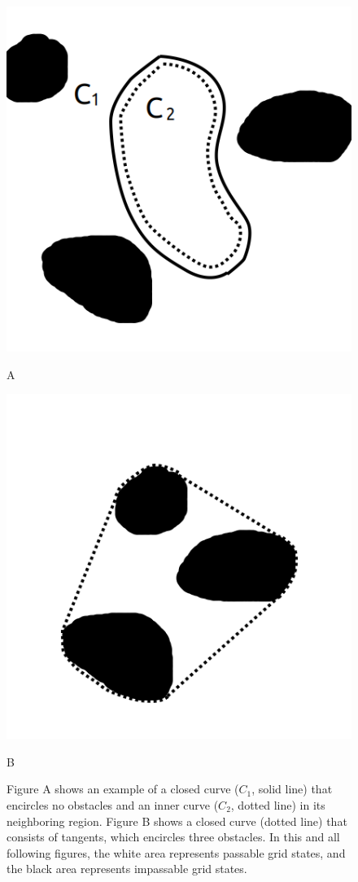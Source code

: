 \documentclass[letterpaper, 10 pt, journal, twoside]{IEEEtran}
\begin{document}
\begin{figure}[t] \scriptsize
\begin{minipage}{.48\linewidth}
  \centerline{\includegraphics[width=4.cm, cframe=gray .2mm]{empty_closed.png}}
  \centerline{A}
\end{minipage}
\hfill
\begin{minipage}{.48\linewidth}
  \centerline{\includegraphics[width=4.cm, cframe=gray .2mm]{tangent_closed.png}}
  \centerline{B}
\end{minipage}
\vfill

\caption{Figure A shows an example of a closed curve ($C_1$, solid line) that encircles no obstacles and an inner curve ($C_2$, dotted line) in its neighboring region. Figure B shows a closed curve (dotted line) that consists of tangents, which encircles three obstacles. In this and all following figures, the white area represents passable grid states, and the black area represents impassable grid states.}
\label{closed_curve}
\end{figure}
\end{document}

